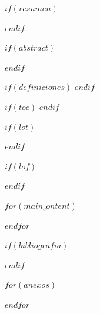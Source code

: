 \documentclass[$if(fontsize)$$fontsize$,$endif$$if(lang)$$lang$,$endif$$if(papersize)$$papersize$,$endif$$for(classoption)$$classoption$$sep$,$endfor$]{$documentclass$}
\renewenvironment{abstract}{
    \newpage
    \null\vfil
    \begin{center}%
        \bfseries \abstractname
    \end{center}
}
{\par\vfil\null\clearpage}
\begin{document}
    $if(resumen)$
        \begin{abstract}
            
        \end{abstract}
        \pagebreak
    $endif$

    $if(abstract)$
        \begin{english}
            \begin{abstract}
                
            \end{abstract}
        \end{english}
        \pagebreak
    $endif$

    $if(definiciones)$
        \printglossary
        \pagebreak
    $endif$

    $if(toc)$
        {
            \hypersetup{linkcolor=black}
            \setcounter{tocdepth}{$toc-depth$}
            \tableofcontents
        }
    $endif$

    $if(lot)$
        \listoftables
    $endif$

    $if(lof)$
        \listoffigures
    $endif$

    \cleardoublepage

    $for(main_content)$
        
        \pagebreak
    $endfor$

    $if(bibliografia)$
        
        \pagebreak
    $endif$

    $for(anexos)$
        
    $endfor$
\end{document}
